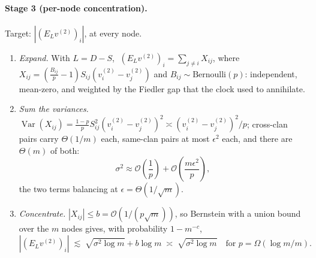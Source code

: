 \documentclass{article}
\begin{document}
\paragraph{Stage 3 (per-node concentration).}
Target: $|(E_L v^{(2)})_i|$, at every node.
\begin{enumerate}
    \item \emph{Expand.} With $L = D - S$, $\;(E_L v^{(2)})_i = \sum_{j \neq i} X_{ij}$, where $X_{ij} = \left(\frac{B_{ij}}{p} - 1\right) S_{ij}(v_i^{(2)} - v_j^{(2)})$ and $B_{ij} \sim \text{Bernoulli}(p)$: independent, mean-zero, and weighted by the Fiedler gap that the clock used to annihilate.
    \item \emph{Sum the variances.} $\operatorname{Var}(X_{ij}) = \frac{1-p}{p}S_{ij}^2(v_i^{(2)} - v_j^{(2)})^2 \asymp (v_i^{(2)} - v_j^{(2)})^2/p$; cross-clan pairs carry $\Theta(1/m)$ each, same-clan pairs at most $\epsilon^2$ each, and there are $\Theta(m)$ of both:
    \begin{equation}
        \sigma^2 \approx \mathcal{O}\!\left(\frac{1}{p}\right) + \mathcal{O}\!\left(\frac{m\epsilon^2}{p}\right),
    \end{equation}
    the two terms balancing at $\epsilon = \Theta(1/\sqrt{m})$.
    \item \emph{Concentrate.} $|X_{ij}| \le b = \mathcal{O}(1/(p\sqrt{m}))$, so Bernstein with a union bound over the $m$ nodes gives, with probability $1 - m^{-c}$,
    \begin{equation}
        \left|(E_L v^{(2)})_i\right| \;\lesssim\; \sqrt{\sigma^2 \log m} + b\log m \;\asymp\; \sqrt{\sigma^2 \log m} \quad \text{for } p = \Omega(\log m/m).
    \end{equation}
\end{enumerate}
\end{document}
